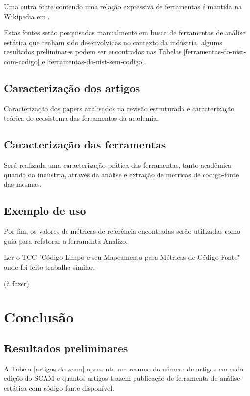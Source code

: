 \documentclass[12pt]{article}
\begin{document}
Uma outra fonte contendo uma relação expressiva de ferramentas é mantida na
Wikipedia em .

Estas fontes serão pesquisadas manualmente em busca de ferramentas de análise
estática que tenham sido desenvolvidas no contexto da indústria, algums
resultados preliminares podem ser encontrados nas Tabelas
\ref{ferramentas-do-nist-com-codigo} e \ref{ferramentas-do-nist-sem-codigo}.

\subsection{Caracterização dos artigos}

Caracterização dos papers analisados na revisão estruturada e caracterização
teórica do ecosistema das ferramentas da academia.

\subsection{Caracterização das ferramentas}

Será realizada uma caracterização prática das ferramentas, tanto acadêmica
quando da indústria, através da análise e extração de métricas de código-fonte
das mesmas.


\subsection{Exemplo de uso}

Por fim, os valores de métricas de referência encontradas serão utilizadas
como guia para refatorar a ferramenta Analizo.

Ler o TCC "Código Limpo e seu Mapeamento para Métricas de Código Fonte" onde
foi feito trabalho similar.

(à fazer)

\section{Conclusão}

\subsection{Resultados preliminares}\label{resultados}

A Tabela \ref{artigos-do-scam} apresenta um resumo do número de artigos em
cada edição do SCAM e quantos artigos trazem publicação de ferramenta de análise
estática com código fonte disponível.
\end{document}
